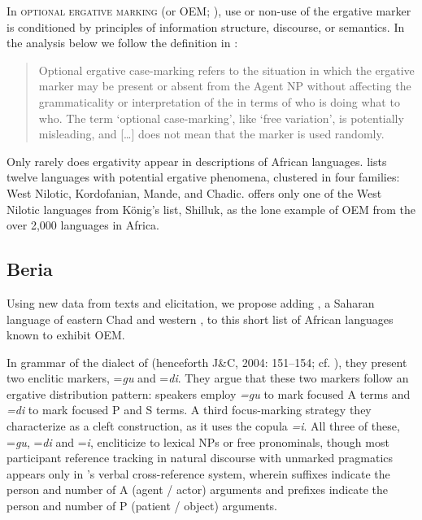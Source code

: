 \documentclass[output=paper,modfonts]{langscibook}
\begin{document}
In \textsc{optional ergative marking} (or OEM; \citealt{McGregor2009,McGregor2010,McGregorVerstraete2010}), use or non-use of the ergative marker is conditioned by principles of information structure, discourse, or semantics. In the analysis below we follow the definition in \citet[493]{McGregor2009}:

\begin{quote}
Optional ergative case-marking refers to the situation in which the ergative marker may be present or absent from the Agent NP without affecting the grammaticality or interpretation of the  in terms of who is doing what to who. The term ‘optional case-marking’, like ‘free variation’, is potentially misleading, and […] does not mean that the marker is used randomly.
\end{quote}

Only rarely does ergativity appear in descriptions of African languages. \citet[95--96]{König2008} lists twelve languages with potential ergative phenomena, clustered in four families: West Nilotic, Kordofanian, Mande, and Chadic. \citet[1631]{McGregor2010} offers only one of the West Nilotic languages from König’s list, Shilluk, as the lone example of OEM from the over 2,000 languages in Africa.


 

\subsection{Beria}
Using new data from texts and elicitation, we propose adding , a Saharan language of eastern Chad and western , to this short list of African languages known to exhibit OEM. 

In   grammar of the  dialect of  (henceforth J\&C, 2004: 151--154; cf. \citealt{Jakobi2006}), they present two enclitic  markers, =\textit{gu} and =\textit{di}. They argue that these two  markers follow an ergative distribution pattern: speakers employ \textit{=gu} to mark focused A terms and \textit{=di} to mark focused P and S terms. A third focus-marking strategy they characterize as a cleft construction, as it uses the copula \textit{=i}. All three of these, =\textit{gu}, =\textit{di} and =\textit{i}, encliticize to lexical NPs or free pronominals, though most participant reference tracking in natural discourse with unmarked pragmatics appears only in ’s verbal cross-reference system, wherein suffixes indicate the person and number of A (agent / actor) arguments and prefixes indicate the person and number of P (patient / object) arguments. 
\end{document}
